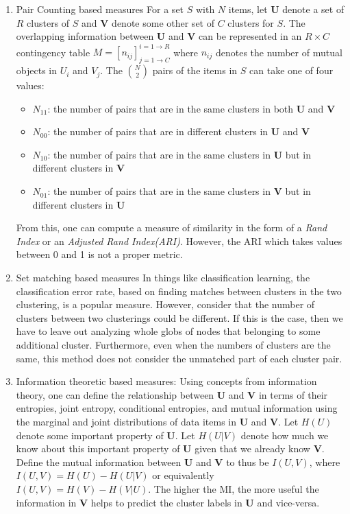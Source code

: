 \documentclass{article}
\begin{document}
\begin{enumerate}
\item Pair Counting based measures
For a set $S$ with $N$ items, let \textbf{U} denote a set of $R$ clusters of $S$ and \textbf{V} denote some other set of $C$ clusters for $S$. The overlapping information between \textbf{U} and \textbf{V} can be represented in an $R \times C$ contingency table $M = [n_{ij}]_{j=1 \to C}^{i=1 \to R}$ where $n_{ij}$ denotes the number of mutual objects in $U_i$ and $V_j$. The ${N \choose 2}$ pairs of the items in $S$ can take one of four values:
\begin{itemize}
\item $N_{11}$: the number of pairs that are in the same clusters in both \textbf{U} and \textbf{V}
\item $N_{00}$: the number of pairs that are in different clusters in \textbf{U} and \textbf{V}
\item $N_{10}$: the number of pairs that are in the same clusters in \textbf{U} but in different clusters in \textbf{V}
\item $N_{01}$: the number of pairs that are in the same clusters in \textbf{V} but in different clusters in \textbf{U}
\end{itemize}
From this, one can compute a measure of similarity in the form of a \textit{Rand Index} or an \textit{Adjusted Rand Index(ARI)}. However, the ARI which takes values between 0 and 1 is not a proper metric.
\item Set matching based measures
In things like classification learning, the classification error rate, based on finding matches between clusters in the two clustering, is a popular measure. However, consider that the number of clusters between two clusterings could be different. If this is the case, then we have to leave out analyzing whole globs of nodes that belonging to some additional cluster. Furthermore, even when the numbers of clusters are the same, this method does not consider the unmatched part of each cluster pair.
\item Information theoretic based measures: Using concepts from information theory, one can define the relationship between \textbf{U} and \textbf{V} in terms of their entropies, joint entropy, conditional entropies, and mutual information using the marginal and joint distributions of data items in \textbf{U} and \textbf{V}. Let $H(U)$ denote some important property of \textbf{U}. Let $H(U|V)$ denote how much we know about this important property of \textbf{U} given that we already know \textbf{V}. Define the mutual information between \textbf{U} and \textbf{V} to thus be $I(U,V)$, where $I(U,V) = H(U) - H(U|V)$ or equivalently $I(U,V) = H(V) - H(V|U)$. The higher the MI, the more useful the information in \textbf{V} helps to predict the cluster labels in \textbf{U} and vice-versa.
\end{enumerate}
\end{document}
